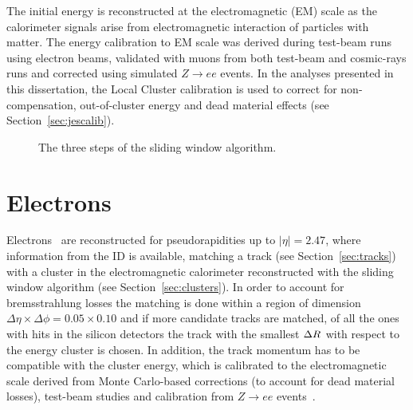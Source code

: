 The initial energy is reconstructed at the electromagnetic (EM) scale as
the calorimeter signals arise from electromagnetic interaction of
particles with matter. The energy calibration to EM scale was derived
during test-beam runs using electron beams, validated with muons
from both test-beam and cosmic-rays runs and corrected using simulated $Z\to ee$ events.
In the analyses presented in this dissertation, the Local Cluster calibration
is used to correct for non-compensation, out-of-cluster energy
and dead material effects (see Section~\ref{sec:jescalib}).

\begin{figure}[tb]\begin{center}
	\caption{The three steps of the sliding window algorithm.
	\label{fig:sliding}}
\end{center}\end{figure}

\section{Electrons}\label{sec:electrons}

Electrons~\cite{eperf} are reconstructed for pseudorapidities up to $|\eta| = 2.47$, where
information from the ID is available, matching a track (see Section~\ref{sec:tracks}) 
with a cluster in the electromagnetic calorimeter reconstructed with the sliding window 
algorithm (see Section~\ref{sec:clusters}).
In order to account for bremsstrahlung losses the matching is done within a region
of dimension $\Delta\eta\times\Delta\phi=0.05\times0.10$ and if more candidate
tracks are matched, of all the ones with hits in the silicon detectors
the track with the smallest $\dr$ with respect to the
energy cluster is chosen. In addition, the track momentum has to be compatible
with the cluster energy, which is calibrated to the electromagnetic scale
derived from Monte Carlo-based corrections (to account for dead material losses),
test-beam studies and calibration from $Z\to ee$ events~\cite{Abat:1900zz}.

